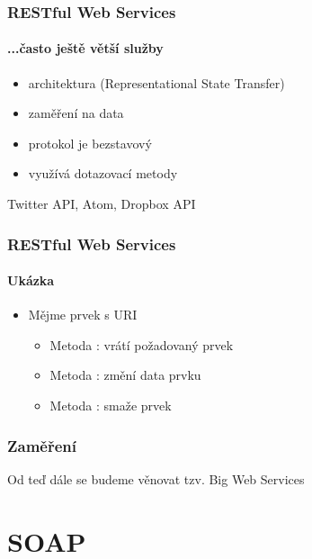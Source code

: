 \documentclass[12pt]{beamer}
\begin{document}
\begin{frame}
  \frametitle{RESTful Web Services}
  \framesubtitle{...často ještě větší služby}
	\begin{itemize}
		\item architektura  (Representational State Transfer)
		\item zaměření na data
		\item protokol je bezstavový
		\item využívá dotazovací metody 
	\end{itemize}
	\begin{example}
		Twitter API, Atom, Dropbox API
	\end{example}
\end{frame}

\begin{frame}
	\frametitle{RESTful Web Services}
	\framesubtitle{Ukázka}
	\begin{itemize}
		\item Mějme prvek s URI 
		\begin{itemize}
			\item Metoda : vrátí požadovaný prvek
			\item Metoda : změní data prvku
			\item Metoda : smaže prvek
		\end{itemize}
	\end{itemize}
	
\end{frame}

\begin{frame}
  \frametitle{Zaměření}

  \begin{example}
    Od teď dále se budeme věnovat tzv. Big Web Services
  \end{example}
\end{frame}

\section{SOAP}
\end{document}
